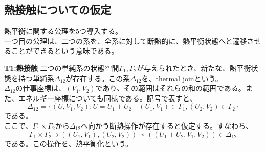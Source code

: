 \documentclass[a4paper,11pt]{jsarticle}
\numberwithin{equation}{section}
\begin{document}
\subsection{熱接触についての仮定}
熱平衡に関する公理を5つ導入する。\\
一つ目の公理は、二つの系を、全系に対して断熱的に、熱平衡状態へと遷移させることができるという意味である。\\
\begin{itembox}[l]{\textbf{T1:熱接触}}
    二つの単純系の状態空間$\Gamma_1,\Gamma_2$が与えられたとき、新たな、熱平衡状態を持つ単純系$\Delta_{12}$が存在する。この系$\Delta_{12}$を、thermal joinという。\\
    $\Delta_{12}$の仕事座標は、$(V_1,V_2)$であり、その範囲はそれらの和の範囲である。また、エネルギー座標についても同様である。記号で表すと、
    \begin{equation}
        \Delta_{12} = \{(U,V_1,V_2):U=U_1+U_2 \quad (U_1,V_1) \in \Gamma_1,(U_2,V_2) \in \Gamma_2\}
    \end{equation}
    である。\\
    ここで、$\Gamma_1 \times \Gamma_2$から$\Delta_{12}$へ向かう断熱操作が存在すると仮定する。すなわち、
    \begin{equation}
        \Gamma_1 \times \Gamma_2 \ni ((U_1,V_1),(U_2,V_2)) \prec ((U_1+U_2,V_1,V_2)) \in \Delta_{12}
    \end{equation}
    である。この操作を、熱平衡化という。
\end{itembox}
\end{document}
